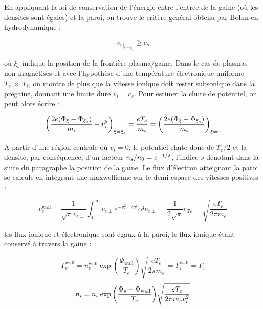 \begin{refsection}
En appliquant la
loi de conservation de l'énergie entre l'entrée de la gaine (où les densités sont égales) et la paroi, on trouve le
critère général obtenu par Bohm en hydrodynamique :

\begin{equation}
	v_{{i}\,|_{\xi=\xi_s}}\geq c_{s}
\end{equation}

où $\xi_s$ indique la position de la frontière plasma/gaine.
Dans le cas de plasmas non-magnétisés et avec l'hypothèse d'une température
électronique uniforme $T_{e}\gg T_{i}$, on montre de plus que la
vitesse ionique doit rester subsonique dans la prégaine, donnant une limite dure
$v_{i}=c_{s}$.
Pour estimer la chute de potentiel, on peut alors écrire :

\begin{equation}
	\left(\frac{2e(\Phi_{\xi}-\Phi_{\xi_{s}})}{m_{i}}+v_{i}^{{2}}\right)_{\xi=\xi_s}=
	\frac{eT_{e}}{m_{i}}=\left(\frac{2e(\Phi_{\xi}-\Phi_{\xi_{s}})}{m_{i}}\right)_{\xi=0}
\end{equation}

A partir d'une région centrale où $v_{i}=0$, le potentiel chute donc de
$T_{e}/2$ et la densité, par conséquence, d'un facteur
$n_{s}/n{_{0}}=e^{-1/2}$, l'indice $s$ dénotant dans la suite du
paragraphe la position de la gaine.
Le flux d'électron atteignant la paroi se calcule en intégrant une maxwellienne sur le
demi-espace des vitesses positives :

\begin{equation}
	v_{e}^\text{wall}=\frac{1}{\sqrt{\pi}v_{e\perp}}\int_0^\infty
	v_{e\perp}
	e^{-v_{e\perp}^2/v_{\text{T}e}^2}dv_{e\perp}=\frac{1}{2\sqrt{\pi}}v_{\text{T}e}=\sqrt{\frac{eT_{e}}{2\pi
	m_{e}}}
\end{equation}

les flux ionique et électronique sont égaux à la paroi, le flux ionique étant
conservé à travers la gaine :

\begin{equation}
	\Gamma_{e}^\text{wall}=n_{e}^\text{wall}\exp{\left(\frac{\Phi_\text{wall}}{T_{e}}\right)}\sqrt{\frac{eT_{e}}{2\pi
	m_{e}}}=\Gamma_{i}^\text{wall}=\Gamma_{i}
\end{equation}
\begin{equation}
\label{1-densitéIonique}
	n_{i}=n_{s}\exp{\left(\frac{\Phi_{s}-\Phi_\text{wall}}{T_{e}}\right)}\sqrt{\frac{eT_{e}}{2\pi
	m_{e}v_{i}^{{2}}}}
\end{equation}


\end{refsection}
